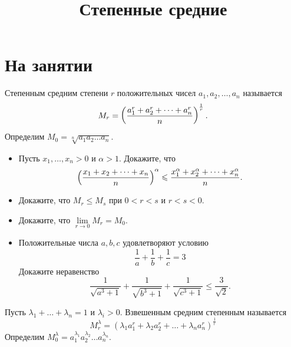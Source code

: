 \documentclass[a4paper,12pt,leqno]{article}
\title{\textbf{Степенные средние}}
\date{}
\begin{document}
	\parskip=0mm
	\linespread{1}
	\maketitle
	
	
	\newcommand{\z}{\addtocounter{zadacha}{1}%
		\boxed{\arabic{zadacha}} }
	\section*{На занятии}
	
    \newcommand{\hw}{\addtocounter{zadacha}{1}%
	\text{ДЗ }\boxed{\arabic{zadacha}} }

    \begin{definition}
        Степенным средним степени $r$ положительных чисел $a_1, a_2, \dots , a_n$ называется 
        $$M_r = \left(\frac{a_1^r + a_2^r + \dots + a_n^r}{n}\right)^{1\over r}.$$
        Определим $M_0 = \sqrt[n]{a_1a_2\dots a_n}.$
    \end{definition}


    \begin{itemize}
        \item[\z] Пусть $x_1, \dots , x_n > 0$ и $\alpha > 1$. Докажите, что 
        $$\left(x_1+x_2+\dots +x_n \over n \right)^\alpha \leqslant \frac{x_1^\alpha + x_2^\alpha + \dots + x_n^\alpha}{n}.$$  
        \item[\z] Докажите, что $M_r \leqslant M_s$ при $0 < r < s$ и $r < s < 0$.
        \item[\z] Докажите, что $\lim\limits_{r \to 0} M_r = M_0$. 
        \item[\z] Положительные числа $a, b, c$ удовлетворяют условию $$\frac{1}{a} + \frac{1}{b} + \frac{1}{c} = 3$$
        Докажите неравенство $$\frac{1}{\sqrt{a^3+1}} + \frac{1}{\sqrt{b^3+1}} + \frac{1}{\sqrt{c^3+1}} \leqslant \frac{3}{\sqrt{2}}.$$  
    \end{itemize}

    \begin{definition}
        Пусть $\lambda_1 + \dots + \lambda_n = 1$ и $\lambda_i > 0$. Взвешенным средним степенным называется
        $$M_r^\lambda = (\lambda_1a_1^r + \lambda_2a_2^r + \dots + \lambda_na_n^r)^{\frac{1}{r}}$$
        Определим $M_0^\lambda = a_1^{\lambda_1}a_2^{\lambda_2}\dots a_n^{\lambda_n}.$
    \end{definition}
\end{document}
